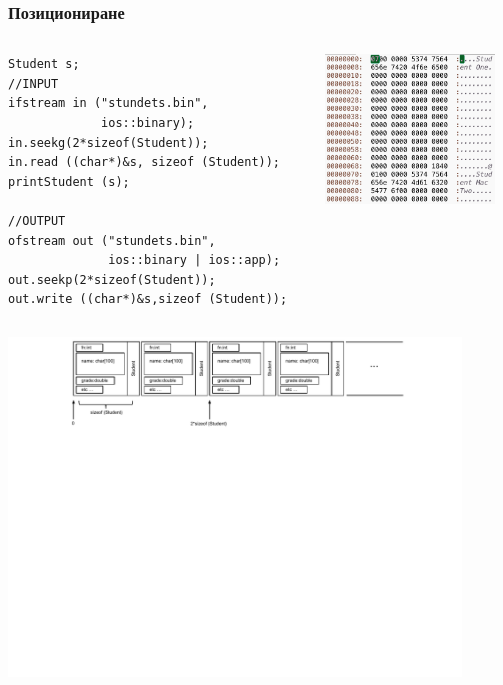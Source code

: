 \documentclass{beamer}
\begin{document}
\begin{frame}[fragile]
\frametitle{Позициониране}

\vspace{-20px}



\begin{columns}[t]
  \begin{column}{0.5\textwidth}

\begin{flushleft}
\begin{lstlisting}
Student s;
//INPUT
ifstream in ("stundets.bin",
             ios::binary);
in.seekg(2*sizeof(Student));
in.read ((char*)&s, sizeof (Student));
printStudent (s);

//OUTPUT
ofstream out ("stundets.bin",
              ios::binary | ios::app);
out.seekp(2*sizeof(Student));
out.write ((char*)&s,sizeof (Student));

\end{lstlisting}
\end{flushleft}   


  \end{column}
  \begin{column}{0.5\textwidth}
\begin{flushright}
  \includegraphics[width=4.5cm]{images/binfiless}
\end{flushright}

  \end{column}
\end{columns}



\includegraphics[width=12cm]{images/binfile}


\end{frame}
\end{document}
